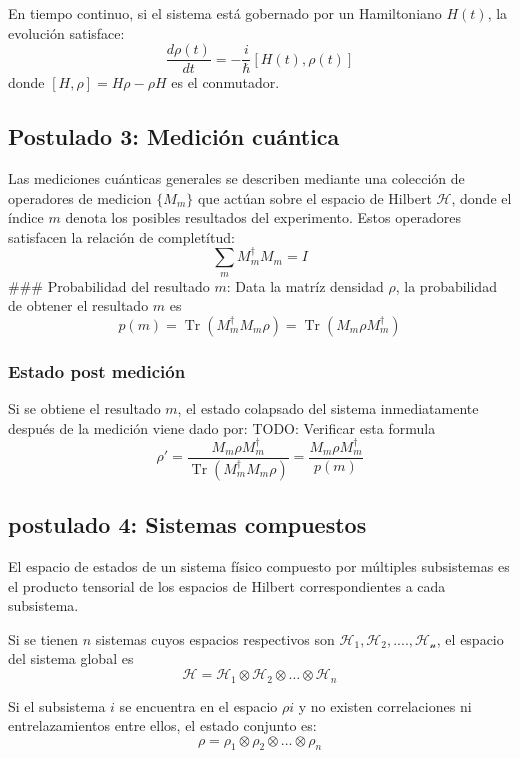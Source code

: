 \documentclass[11pt]{article}
\begin{document}
En tiempo continuo, si el sistema está gobernado por un Hamiltoniano
\(H(t)\), la evolución
satisface:\[\frac{d\rho(t)}{dt} = -\frac{i}{\hbar} [H(t), \rho(t)]\]donde
\([H, \rho] = H\rho - \rho H\) es el conmutador.

    \subsection{Postulado 3: Medición
cuántica}\label{postulado-3-mediciuxf3n-cuuxe1ntica}

Las mediciones cuánticas generales se describen mediante una colección
de operadores de medicion \(\{M_m\}\) que actúan sobre el espacio de
Hilbert \(\mathcal{H}\), donde el índice \(m\) denota los posibles
resultados del experimento. Estos operadores satisfacen la relación de
completítud: \[\sum_m M_m^\dagger M_m = I\] \#\#\# Probabilidad del
resultado \(m\): Data la matríz densidad \(\rho\), la probabilidad de
obtener el resultado \(m\) es
\[p(m) = \operatorname{Tr}(M_m^\dagger M_m \rho) = \operatorname{Tr}(M_m \rho M_m^\dagger)\]

\subsubsection{Estado post medición}\label{estado-post-mediciuxf3n}

Si se obtiene el resultado \(m\), el estado colapsado del sistema
inmediatamente después de la medición viene dado por: TODO: Verificar
esta formula
\[\rho' = \frac{M_m \rho M_m^\dagger}{\operatorname{Tr}(M_m^\dagger M_m \rho)} = \frac{M_m \rho M_m^\dagger}{p(m)}\]

    \subsection{postulado 4: Sistemas
compuestos}\label{postulado-4-sistemas-compuestos}

El espacio de estados de un sistema físico compuesto por múltiples
subsistemas es el producto tensorial de los espacios de Hilbert
correspondientes a cada subsistema.

Si se tienen \(n\) sistemas cuyos espacios respectivos son
\(\mathcal{H_1}, \mathcal{H_2}, ...., \mathcal{H_n}\), el espacio del
sistema global es
\[\mathcal{H} = \mathcal{H}_1 \otimes \mathcal{H}_2 \otimes \dots \otimes \mathcal{H}_n\]

Si el subsistema \(i\) se encuentra en el espacio \(\rho i\) y no
existen correlaciones ni entrelazamientos entre ellos, el estado
conjunto es:
\[\rho = \rho_1 \otimes \rho_2 \otimes \dots \otimes \rho_n\]
\end{document}
